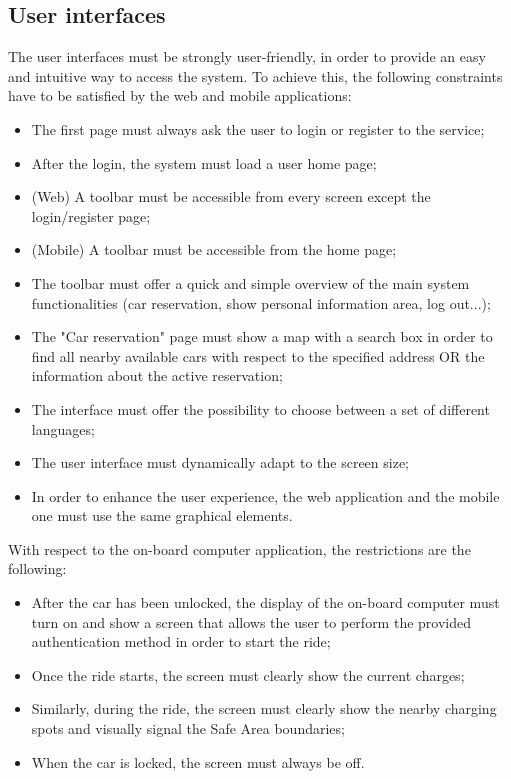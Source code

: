 \subsection{User interfaces}
The user interfaces must be strongly user-friendly, in order to provide an easy and intuitive way to access the system. To achieve this, the following constraints have to be satisfied by the web and mobile applications:
\begin{itemize}
\item The first page must always ask the user to login or register to the service;
\item After the login, the system must load a user home page;
\item (Web) A toolbar must be accessible from every screen except the login/register page;
\item (Mobile) A toolbar must be accessible from the home page;
\item The toolbar must offer a quick and simple overview of the main system functionalities (car reservation, show personal information area, log out...);
\item The "Car reservation" page must show a map with a search box in order to find all nearby available cars with respect to the specified address OR the information about the active reservation;
\item The interface must offer the possibility to choose between a set of different languages;
\item The user interface must dynamically adapt to the screen size;
\item In order to enhance the user experience, the web application and the mobile one must use the same graphical elements.
\end{itemize}
With respect to the on-board computer application, the restrictions are the following:
\begin{itemize}
\item After the car has been unlocked, the display of the on-board computer must turn on and show a screen that allows the user to perform the provided authentication method in order to start the ride;
\item Once the ride starts, the screen must clearly show the current charges;
\item Similarly, during the ride, the screen must clearly show the nearby charging spots and visually signal the Safe Area boundaries;
\item When the car is locked, the screen must always be off.
\end{itemize}
